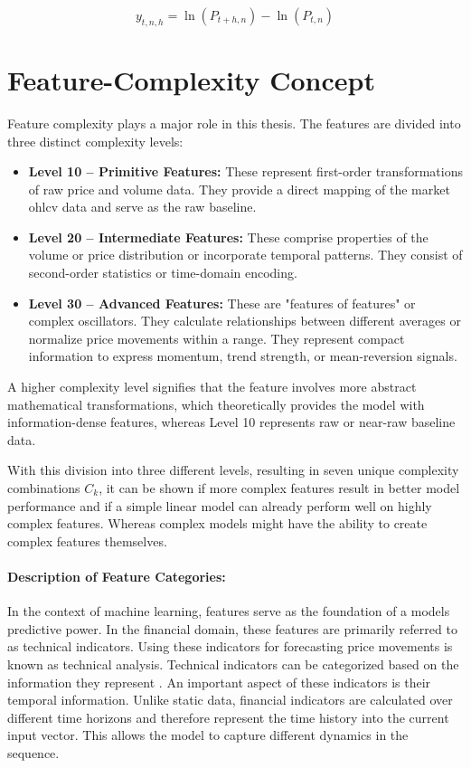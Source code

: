 \documentclass[12pt,twoside=false,a4paper,parskip]{scrbook}
\begin{document}
\begin{equation}
y_{t, n, h} = \ln(P_{t+h, n}) - \ln(P_{t, n})
\end{equation}

\section{Feature-Complexity Concept}

Feature complexity plays a major role in this thesis. The features are divided into three distinct complexity levels:

\begin{itemize}
    \item \textbf{Level 10 – Primitive Features:} These represent first-order transformations of raw price and volume data. They provide a direct mapping of the market \gls{ohlcv} data and serve as the raw baseline.

    \item \textbf{Level 20 – Intermediate Features:} These comprise properties of the volume or price distribution or incorporate temporal patterns. They consist of second-order statistics or time-domain encoding.   

    \item \textbf{Level 30 – Advanced Features:} These are "features of features" or complex oscillators. They calculate relationships between different averages or normalize price movements within a range. They represent compact information to express momentum, trend strength, or mean-reversion signals.

\end{itemize}
A higher complexity level signifies that the feature involves more abstract mathematical transformations, which theoretically provides the model with information-dense features, whereas Level 10 represents raw or near-raw baseline data.

With this division into three different levels, resulting in seven unique complexity combinations $C_k$, it can be shown if more complex features result in better model performance and if a simple linear model can already perform well on highly complex features. Whereas complex models might have the ability to create complex features themselves.

\paragraph{Description of Feature Categories:}
In the context of machine learning, features serve as the foundation of a models predictive power. In the financial domain, these features are primarily referred to as technical indicators. Using these indicators for forecasting price movements is known as technical analysis.
Technical indicators can be categorized based on the information they represent \cite{murphy1999technical}.  
An important aspect of these indicators is their temporal information. Unlike static data, financial indicators are calculated over different time horizons and therefore represent the time history into the current input vector. This allows the model to capture different dynamics in the sequence.
\end{document}
